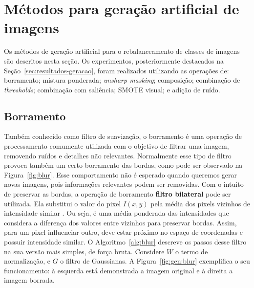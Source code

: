 \section{Métodos para geração artificial de imagens}

Os métodos de geração artificial para o rebalanceamento de classes de imagens são descritos nesta seção. Os experimentos, posteriormente destacados na Seção~\ref{sec:resultados-geracao}, foram realizados utilizando as operações de: borramento; mistura ponderada; \textit{unsharp masking}; composição; combinação de \textit{thresholds}; combinação com saliência; SMOTE visual; e adição de ruído.

\subsection{Borramento}

Também conhecido como filtro de suavização, o borramento é uma operação de processamento comumente utilizada com o objetivo de filtrar uma imagem, removendo ruídos e detalhes não relevantes. Normalmente esse tipo de filtro provoca também um certo borramento das bordas, como pode ser observado na Figura~\ref{fig:blur}. Esse comportamento não é esperado quando queremos gerar novas imagens, pois informações relevantes podem ser removidas. Com o intuito de preservar as bordas, a operação de borramento \textbf{filtro bilateral} pode ser utilizada. Ela substitui o valor do pixel $I(x,y)$ pela média dos pixels vizinhos de intensidade similar \cite{Tomasi1998}. Ou seja, é uma média ponderada das intensidades que considera a diferença dos valores entre vizinhos para preservar bordas. Assim, para um pixel influenciar outro, deve estar próximo no espaço de coordenadas e possuir intensidade similar. O Algoritmo~\ref{alg:blur} descreve os passos desse filtro na sua versão mais simples, de força bruta. Considere $W$ o termo de normalização, e $G$ o filtro de Gaussianas. A Figura~\ref{fig:gen:blur} exemplifica o seu funcionamento: à esquerda está demonstrada a imagem original e à direita a imagem borrada.

